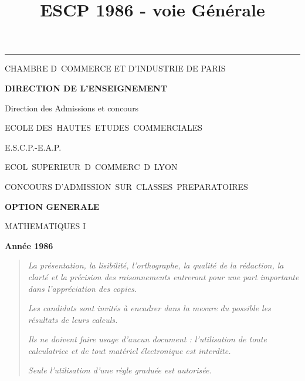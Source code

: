\documentclass[11pt]{article}%
\title{\bf \vspace{-2cm} ESCP 1986 - voie Générale} %
\author{} %
\date{} %
\begin{document}
\maketitle %
\vspace{-1.4cm}\hrule %
\thispagestyle{fancy}

\vspace*{.2cm}




\begin{center}
{\small CHAMBRE D\E\ COMMERCE ET D'INDUSTRIE DE PARIS}

\textbf{DIRECTION DE L'ENSEIGNEMENT}

Direction des Admissions et concours

\underline{\hspace*{3cm}}

{\Large ECOLE DES\ HAUTES\ ETUDES\ COMMERCIALES}

{\Large E.S.C.P.-E.A.P.}

{\Large ECOL\E\ SUPERIEUR\E\ D\E\ COMMERC\E\ D\E\ LYON}{\large }

CONCOURS D'ADMISSION\ SUR\ CLASSES\ PREPARATOIRES

\underline{\hspace*{3cm}}

\textbf{OPTION GENERALE}

{\Large MATHEMATIQUES I}

\textbf{Année 1986}

\underline{\hspace*{3cm}}
\end{center}

\begin{quotation}
\noindent \textsl{La présentation, la lisibilité, l'orthographe, la
qualité
de la rédaction, la clarté et la précision des raisonnements entreront
pour
une part importante dans l'appréciation des copies.}

\noindent \textsl{Les candidats sont invités à encadrer dans la mesure
du
possible les résultats de leurs calculs.}

\noindent \textsl{Ils ne doivent faire usage d'aucun document :
l'utilisation de toute calculatrice et de tout matériel électronique
est
interdite.}

\noindent \textsl{Seule l'utilisation d'une règle graduée est
autorisée.}

\noindent \textsl{\hrulefill }
\end{quotation}
\end{document}
